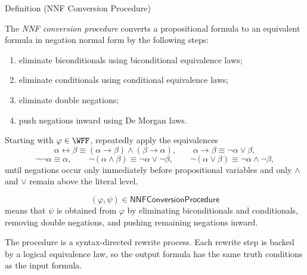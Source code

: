\begin{definitionbox}{Definition (NNF Conversion Procedure)}
\begin{definition}
\label{def:nnf-conversion-procedure-propositional-logic}
The \emph{NNF conversion procedure} converts a propositional formula to an
equivalent formula in negation normal form by the following steps:
\begin{enumerate}
\item eliminate biconditionals using biconditional equivalence laws;
\item eliminate conditionals using conditional equivalence laws;
\item eliminate double negations;
\item push negations inward using De Morgan laws.
\end{enumerate}
\end{definition}
\end{definitionbox}

\begin{remark*}
Starting with \(\varphi\in\WFF\), repeatedly apply the equivalences
\[
\alpha\leftrightarrow\beta
\equiv
(\alpha\to\beta)\land(\beta\to\alpha),
\qquad
\alpha\to\beta\equiv\neg\alpha\lor\beta,
\]
\[
\neg\neg\alpha\equiv\alpha,
\qquad
\neg(\alpha\land\beta)\equiv\neg\alpha\lor\neg\beta,
\qquad
\neg(\alpha\lor\beta)\equiv\neg\alpha\land\neg\beta,
\]
until negations occur only immediately before propositional variables and only
\(\land\) and \(\lor\) remain above the literal level.
\end{remark*}

\begin{remark*}
\[
(\varphi,\psi)\in\mathsf{NNFConversionProcedure}
\]
means that \(\psi\) is obtained from \(\varphi\) by eliminating
biconditionals and conditionals, removing double negations, and pushing
remaining negations inward.
\end{remark*}

\begin{remark*}[Interpretation]
The procedure is a syntax-directed rewrite process. Each rewrite step is backed
by a logical equivalence law, so the output formula has the same truth
conditions as the input formula.
\end{remark*}

